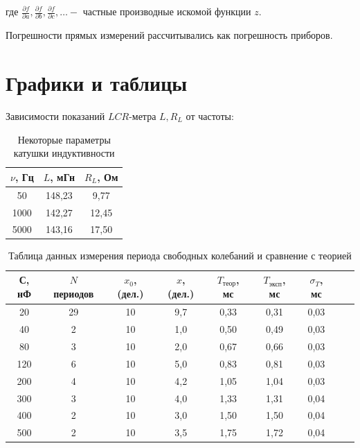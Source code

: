 \documentclass[a4paper, 12pt]{article}%
\begin{document}
где $\frac{\partial f}{\partial a}, \frac{\partial f}{\partial b}, \frac{\partial f}{\partial c}, \ldots-$ частные производные искомой функции $z$.

Погрешности прямых измерений рассчитывались как погрешность приборов.

\section{Графики и таблицы}

Зависимости показаний $LCR$-метра $L, R_L$ от частоты:   

\begin{table}[h!]
\begin{center}
\begin{tabular}{|c|c|c|}
\hline
$\nu$, Гц & $L$, мГн & $R_L$, Ом \\ \hline
50        & 148,23    & 9,77      \\ \hline
1000      & 142,27    & 12,45      \\ \hline
5000      & 143,16    & 17,50      \\ \hline
\end{tabular}
\caption{Некоторые параметры катушки индуктивности}
\end{center}
\end{table}

\begin{table}[h!]
\begin{center}
\begin{tabular}{|c|c|c|c|c|c|c|c|c|}
\hline
С, нФ & $N$ периодов & $x_0$, (дел.) & $x$, (дел.) & $T_{\text{теор}}$, мс & $T_{\text{эксп}}$, мс & $\sigma_T$, мс \\ \hline
20               & 29  & 10  &  9,7    & 0,33           & 0,31            & 0,03           \\ \hline
40               & 2   & 10  &  1,0    & 0,50           & 0,49            & 0,03           \\ \hline
80               & 3   & 10  &  2,0    & 0,67           & 0,66            & 0,03           \\ \hline
120              & 6   & 10  &  5,0    & 0,83           & 0,81            & 0,03           \\ \hline
200              & 4   & 10  &  4,2    & 1,05           & 1,04            & 0,03           \\ \hline
300              & 3   & 10  &  4,0    & 1,33           & 1,31            & 0,04           \\ \hline
400              & 2   & 10  &  3,0    & 1,50           & 1,50            & 0,04           \\ \hline
500              & 2   & 10  &  3,5    & 1,75           & 1,72            & 0,04           \\ \hline
\end{tabular}
\caption{Таблица данных измерения периода свободных колебаний и сравнение с теорией}
\end{center}
\end{table}
\end{document}
